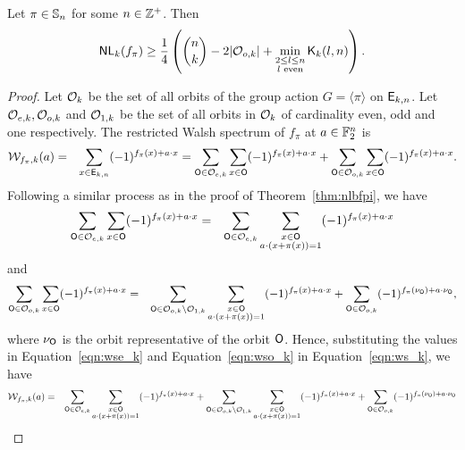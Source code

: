 \documentclass{llncs}
\begin{document}
\begin{theorem}\label{thm:NLkb}
Let $\pi \in \mathbb{S}_n$ for some $n \in \mathbb{Z}^+$.
Then $$\mathsf{NL}_{k}(f_\pi) \geq \frac{1}{4}\left({n \choose k} - 2|\mathcal{O}_{o,k}| + \min_{\substack{2 \leq l \leq n \\ l \text{ even}}} \mathsf{K}_{k}(l,n)\right).$$
\end{theorem}
\begin{proof}
Let $\mathcal{O}_k$ be the set of all orbits of the group action $G = \langle \pi \rangle$ on $\mathsf{E}_{k,n}$.
Let $\mathcal{O}_{e,k}, \mathcal{O}_{o,k}$ and $\mathcal{O}_{1,k}$ be the set of all orbits in $\mathcal{O}_k$ of cardinality even, odd and one respectively. The restricted Walsh spectrum of $f_\pi$ at $a \in \mathbb{F}_2^n$ is
\begin{eqnarray} \label{eqn:ws_k}
\mathcal{W}_{f_\pi,k}(a) & =  & \sum_{x \in \mathsf{E}_{k,n}} (-1)^{f_\pi (x)+a \cdot x} 
 = \sum_{\mathsf{O} \in \mathcal{O}_{e,k}} \sum_{x \in \mathsf{O}} (-1)^{ f_\pi (x) + a \cdot x} + \sum_{\mathsf{O} \in \mathcal{O}_{o,k}} \sum_{x \in \mathsf{O}} (-1)^{ f_\pi (x) + a \cdot x}.
\end{eqnarray}
Following a similar process as in the proof of Theorem~\ref{thm:nlbfpi}, we have
\begin{eqnarray}\label{eqn:wse_k}
\sum_{\mathsf{O} \in \mathcal{O}_{e,k}} \sum_{x \in \mathsf{O}} (-1)^{ f_\pi(x) + a \cdot x} 
& = & \sum_{\mathsf{O} \in \mathcal{O}_{e,k}} \sum_{\substack{x \in \mathsf{O} \\ a \cdot (x + \pi(x))= 1}} (-1)^{f_\pi(x)+ a \cdot x} 
\end{eqnarray}
and 
\begin{eqnarray}\label{eqn:wso_k}
\sum_{\mathsf{O} \in \mathcal{O}_{o,k}} \sum_{x \in \mathsf{O}} (-1)^{ f_\pi(x) + a \cdot x} 
& = & \sum_{\mathsf{O} \in \mathcal{O}_{o,k}\setminus \mathcal{O}_{1,k}} \sum_{\substack{x \in \mathsf{O} \\ a \cdot (x + \pi(x))= 1}} (-1)^{f_\pi(x)+ a \cdot x} + \sum_{\mathsf{O} \in \mathcal{O}_{o,k}} (-1)^{ f_\pi(\nu_{\mathsf{O}}) + a \cdot \nu_{\mathsf{O}}},
\end{eqnarray}
where $\nu_{\mathsf{O}}$ is the orbit representative of the orbit $\mathsf{O}$.
Hence, substituting the values in Equation~\ref{eqn:wse_k} and Equation~\ref{eqn:wso_k} in Equation~\ref{eqn:ws_k}, we have
\begin{eqnarray*}
\wtk{f_\pi}{k}(a) & =  & \sum_{\orb \in \orbs_{e,k}} \sum_{\substack{x \in \orb \\ a \cdot (x + \pi(x))= 1}} (-1)^{f_\pi(x)+ a \cdot x} + \sum_{\orb \in \orbs_{o,k}\setminus \orbs_{1,k}} \sum_{\substack{x \in \orb \\ a \cdot (x + \pi(x))= 1}} (-1)^{f_\pi(x)+ a \cdot x} + \sum_{\orb \in \orbs_{o,k}} (-1)^{ f_\pi(\nu_\orb) + a \cdot \nu_\orb} \nonumber \\

\end{eqnarray*}
\end{proof}
\end{document}
